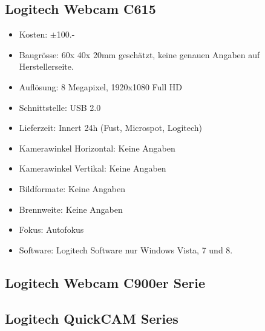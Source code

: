 \subsection{Logitech Webcam C615}
\begin{itemize}
\item Kosten: $\pm$100.-
\item Baugrösse: 60x 40x 20mm geschätzt, keine genauen Angaben auf Herstellerseite.
\item Auflösung: 8 Megapixel, 1920x1080 Full HD
\item Schnittstelle: USB 2.0
\item Lieferzeit: Innert 24h (Fust, Microspot, Logitech)
\item Kamerawinkel Horizontal: Keine Angaben
\item Kamerawinkel Vertikal: Keine Angaben
\item Bildformate: Keine Angaben
\item Brennweite: Keine Angaben
\item Fokus: Autofokus
\item Software: Logitech Software nur Windows Vista, 7 und 8.
\end{itemize}
\subsection{Logitech Webcam C900er Serie}

\subsection{Logitech QuickCAM Series}